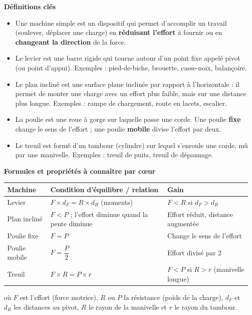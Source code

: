 \documentclass[11pt]{article}
\newcommand{\cle}[1]{{\popxbold\color{popdark}#1}}
\begin{document}
\begin{bilan}
\textbf{Définitions clés}
\begin{itemize}
  \item Une \cle{machine simple} est un dispositif qui permet d'accomplir un travail (soulever, déplacer une charge) en \textbf{réduisant l'effort} à fournir ou en \textbf{changeant la direction} de la force.
  \item Le \cle{levier} est une barre rigide qui tourne autour d'un point fixe appelé \cle{pivot} (ou point d'appui). Exemples : pied-de-biche, brouette, casse-noix, balançoire.
  \item Le \cle{plan incliné} est une surface plane inclinée par rapport à l'horizontale : il permet de monter une charge avec un effort plus faible, mais sur une distance plus longue. Exemples : rampe de chargement, route en lacets, escalier.
  \item La \cle{poulie} est une roue à gorge sur laquelle passe une corde. Une poulie \textbf{fixe} change le sens de l'effort ; une poulie \textbf{mobile} divise l'effort par deux.
  \item Le \cle{treuil} est formé d'un tambour (cylindre) sur lequel s'enroule une corde, mû par une manivelle. Exemples : treuil de puits, treuil de dépannage.
\end{itemize}

\textbf{Formules et propriétés à connaître par cœur}
\begin{center}
\begin{tabularx}{\linewidth}{|l|X|X|}
\hline
\rowcolor{popblueL} \textbf{Machine} & \textbf{Condition d'équilibre / relation} & \textbf{Gain} \\
\hline
Levier & $F \times d_{F} = R \times d_{R}$ (moments) & $F < R$ si $d_{F} > d_{R}$ \\
\hline
Plan incliné & $F < P$ ; l'effort diminue quand la pente diminue & Effort réduit, distance augmentée \\
\hline
Poulie fixe & $F = P$ & Change le sens de l'effort \\
\hline
Poulie mobile & $F = \dfrac{P}{2}$ & Effort divisé par 2 \\
\hline
Treuil & $F \times R = P \times r$ & $F < P$ si $R > r$ (manivelle longue) \\
\hline
\end{tabularx}
\end{center}
où $F$ est l'effort (force motrice), $R$ ou $P$ la résistance (poids de la charge), $d_{F}$ et $d_{R}$ les distances au pivot, $R$ le rayon de la manivelle et $r$ le rayon du tambour.


\end{bilan}
\end{document}
